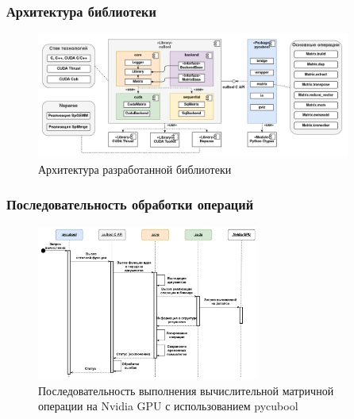 \documentclass[aspectratio=169,xcolor=table,english]{beamer}
\begin{document}
\begin{frame}[fragile] \frametitle{Архитектура библиотеки}
    \begin{center}
    \begin{minipage}[m]{\linewidth}
        \begin{figure}
            \centering
            \includegraphics[width=0.92\textwidth]{figures/library_architecture.png}
            \caption{Архитектура разработанной библиотеки}
        \end{figure}
    \end{minipage}\hfill    
    \end{center}
\end{frame}

\begin{frame}[fragile] \frametitle{Последовательность обработки операций}
    \begin{center}
    \begin{minipage}[m]{0.85\linewidth}
        \begin{figure}
            \centering
            \includegraphics[width=0.65\textwidth]{figures/library_sequence_use.png}
            \caption{Последовательность выполнения вычислительной матричной операции на Nvidia GPU с использованием pycubool}
        \end{figure}
    \end{minipage}\hfill    
    \end{center}
\end{frame}
\end{document}

